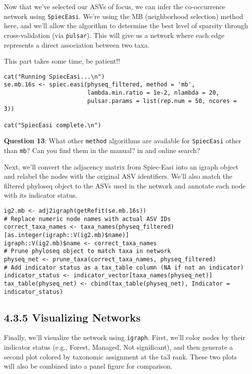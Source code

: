 \documentclass[
]{book}
\begin{document}
Now that we've selected our ASVs of focus, we can infer the co-occurrence network using \texttt{SpiecEasi}. We're using the MB (neighborhood selection) method here, and we'll allow the algorithm to determine the best level of sparsity through cross-validation (via \texttt{pulsar}). This will give us a network where each edge represents a direct association between two taxa.

This part takes some time, be patient!!

\begin{verbatim}
cat("Running SpiecEasi...\n")
se.mb.16s <- spiec.easi(physeq_filtered, method = 'mb',
                        lambda.min.ratio = 1e-2, nlambda = 20,
                        pulsar.params = list(rep.num = 50, ncores = 3))

cat("SpiecEasi complete.\n")
\end{verbatim}

\textbf{Question 13}: What other \texttt{method} algorithms are available for \texttt{SpiecEasi} other than \texttt{mb}? Can you find them in the manual? in and online search?

Next, we'll convert the adjacency matrix from Spiec-Easi into an igraph object and relabel the nodes with the original ASV identifiers. We'll also match the filtered phyloseq object to the ASVs used in the network and annotate each node with its indicator status.

\begin{verbatim}
ig2.mb <- adj2igraph(getRefit(se.mb.16s))
# Replace numeric node names with actual ASV IDs
correct_taxa_names <- taxa_names(physeq_filtered)[as.integer(igraph::V(ig2.mb)$name)]
igraph::V(ig2.mb)$name <- correct_taxa_names
# Prune phyloseq object to match taxa in network
physeq_net <- prune_taxa(correct_taxa_names, physeq_filtered)
# Add indicator status as a tax_table column (NA if not an indicator)
indicator_status <- indicator_vector[taxa_names(physeq_net)]
tax_table(physeq_net) <- cbind(tax_table(physeq_net), Indicator = indicator_status)
\end{verbatim}

\subsection{4.3.5 Visualizing Networks}\label{visualizing-networks}

Finally, we'll visualize the network using \texttt{igraph}. First, we'll color nodes by their indicator status (e.g., Forest, Managed, Not significant), and then generate a second plot colored by taxonomic assignment at the ta3 rank. These two plots will also be combined into a panel figure for comparison.
\end{document}
